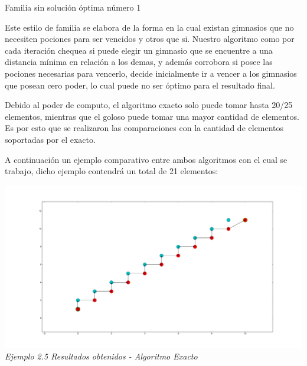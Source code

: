 \begin{center}
Familia sin soluci\'on \'optima n\'umero 1
\end{center}

Este estilo de familia se elabora de la forma en la cual existan gimnasios que no necesiten pociones para ser vencidos y otros que si. Nuestro algoritmo como por cada iteraci\'on chequea si puede elegir un gimnasio que se encuentre a una distancia m\'inima en relaci\'on a los demas, y adem\'as corrobora si posee las pociones necesarias para vencerlo, decide inicialmente ir a vencer a los gimnasios que posean cero poder, lo cual puede no ser \'optimo para el resultado final.

Debido al poder de computo, el algoritmo exacto solo puede tomar hasta 20/25 elementos, mientras que el goloso puede tomar una mayor cantidad de elementos. Es por esto que se realizaron las comparaciones con la cantidad de elementos soportadas por el exacto.

A continuaci\'on un ejemplo comparativo entre ambos algoritmos con el cual se trabajo, dicho ejemplo contendr\'a un total de 21 elementos:


\vspace*{0.3cm} \vspace*{0.3cm}
  \begin{center}
\includegraphics[scale=0.5]{./EJ2/algunGym0Exacto.png}
\\{\textit{Ejemplo 2.5 Resultados obtenidos - Algoritmo Exacto }}
  \end{center}
  \vspace*{0.3cm}

